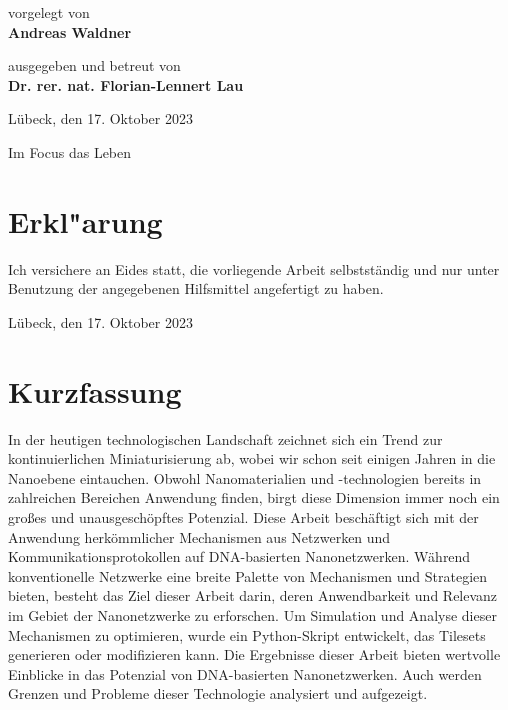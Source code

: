 \begin{titlepage}
{	\titlepageskip
	vorgelegt von\\
	\textbf{Andreas Waldner}

	\titlepageskip
	ausgegeben und betreut von\\
	\textbf{Dr. rer. nat. Florian-Lennert Lau}

	\titlepageskip
	

	\vfill
	{
		Lübeck, den 17. Oktober 2023
	}

	{
		\titlepageskip
		Im Focus das Leben
	}
}
\end{titlepage}
\restoregeometry

\cleardoublepage

\newpage
\chapter*{Erkl"arung}

Ich versichere an Eides statt, die vorliegende Arbeit selbstständig und nur unter Benutzung
der angegebenen Hilfsmittel angefertigt zu haben.

\vspace*{3cm}
Lübeck, den 17. Oktober 2023

\thispagestyle{empty}
\cleardoublepage



\chapter*{Kurzfassung}

In der heutigen technologischen Landschaft zeichnet sich ein Trend zur kontinuierlichen Miniaturisierung ab, wobei wir schon seit einigen Jahren in die Nanoebene eintauchen. Obwohl Nanomaterialien und -technologien bereits in zahlreichen Bereichen Anwendung finden, birgt diese Dimension immer noch ein großes und unausgeschöpftes Potenzial. Diese Arbeit beschäftigt sich mit der Anwendung herkömmlicher Mechanismen aus Netzwerken und Kommunikationsprotokollen auf DNA-basierten Nanonetzwerken. Während konventionelle Netzwerke eine breite Palette von Mechanismen und Strategien bieten, besteht das Ziel dieser Arbeit darin, deren Anwendbarkeit und Relevanz im Gebiet der Nanonetzwerke zu erforschen. Um Simulation und Analyse dieser Mechanismen zu optimieren, wurde ein Python-Skript entwickelt, das Tilesets generieren oder modifizieren kann. Die Ergebnisse dieser Arbeit bieten wertvolle Einblicke in das Potenzial von DNA-basierten Nanonetzwerken. Auch werden Grenzen und Probleme dieser Technologie analysiert und aufgezeigt.

